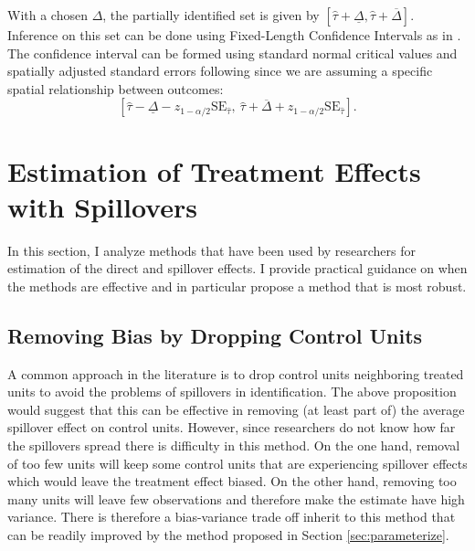 \documentclass[11pt]{article}
\begin{document}
With a chosen $\Delta$, the partially identified set is given by $[\hat{\tau} + \underline{\Delta}, \hat{\tau} + \overline{\Delta}]$. Inference on this set can be done using Fixed-Length Confidence Intervals as in \citet{Rambachan_Roth_2020}. The confidence interval can be formed using standard normal critical values and spatially adjusted standard errors following \citet{Conley_1999} since we are assuming a specific spatial relationship between outcomes: \[ 
    \left[ \hat{\tau} - \underline{\Delta} - z_{1 - \alpha/2} \text{SE}_{\hat{\tau}}, \ \hat{\tau} + \overline{\Delta} + z_{1 - \alpha/2} \text{SE}_{\hat{\tau}}\right].  
\]


\section{Estimation of Treatment Effects with Spillovers}
\label{sec:estimation}

In this section, I analyze methods that have been used by researchers for estimation of the direct and spillover effects. I provide practical guidance on when the methods are effective and in particular propose a method that is most robust.

\subsection{Removing Bias by Dropping Control Units}

A common approach in the literature is to drop control units neighboring treated units to avoid the problems of spillovers in identification. The above proposition would suggest that this can be effective in removing (at least part of) the average spillover effect on control units. However, since researchers do not know how far the spillovers spread there is difficulty in this method. On the one hand, removal of too few units will keep some control units that are experiencing spillover effects which would leave the treatment effect biased. On the other hand, removing too many units will leave few observations and therefore make the estimate have high variance. There is therefore a bias-variance trade off inherit to this method that can be readily improved by the method proposed in Section \ref{sec:parameterize}.
\end{document}
